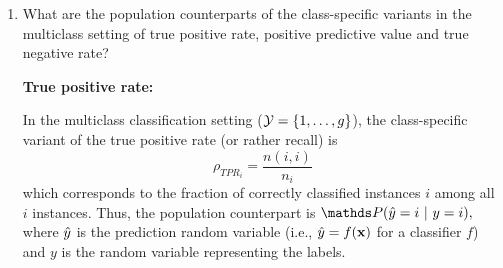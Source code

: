 \documentclass[a4paper]{article}
\begin{document}
{\begin{enumerate}
	G score is computed by $ \rho_{G} =  \sqrt{\rho_{PPV} \cdot \rho_{TPR} }.$
%	
	Thus, with the above
%	
	$$		\rho_{G}(M_1) = 0  , \quad \rho_{G} (M_2)   = \sqrt{1 \cdot 0.5} = \sqrt{0.5} \approx 0.7071  ,\quad \rho_{G}(M_3)  = \sqrt{1 \cdot 0.5} = \sqrt{0.5} \approx 0.7071.	$$
	
	
	\textbf{G mean:}
	
	G mean is computed by $ \rho_{G_m} =  \sqrt{\rho_{TNR} \cdot \rho_{TPR} },$ where $\rho_{TNR} = \frac{TN}{TN + FP}$ and $\rho_{TPR} = \frac{TP}{TP + FN}.$
%	
	For the TNR we have
	$$		\rho_{TNR}(M_1) = \frac{990}{1000} = 0.99  , \quad \rho_{TNR} (M_2)   =  \frac{980}{980} = 1  ,\quad \rho_{TNR}(M_3)  =    \frac{980}{990} \approx 0.9899  ,	$$
	Thus, with the above
	$$		\rho_{G_m}(M_1) = 0, \quad \rho_{G_m} (M_2)   = \sqrt{1 \cdot 0.5} = \sqrt{0.5} \approx 0.7071  ,\quad \rho_{G_m}(M_3)  = \sqrt{1 \cdot \frac{980}{990} } \approx 0.9949.	$$
	
	
	\textbf{BAC:}
	
	BAC is computed by $ \rho_{BAC} =  \frac{\rho_{TNR} + \rho_{TPR} }{2}.$	
%	
	Thus, with the above
	$$		\rho_{BAC}(M_1) = \frac{0 + 990/1000}{2} \approx 0.5, \quad \rho_{BAC} (M_2)   = \frac{1 + 0.5}{2} = 0.75,\quad \rho_{BAC}(M_3)  = \frac{1 + \frac{980}{990} }{2} \approx 0.9949.	$$
%	
	
	\textbf{MCC:}
%	
	MCC is computed by $ \rho_{MCC} =  \frac{TP\cdot TN - FP\cdot FN}{ \sqrt{(TP+FN)(TP+FP)(TN+FN)(TN+FP)} }.$	
	Thus, with the above
	$$		\rho_{MCC}(M_1) = 0, \quad \rho_{MCC} (M_2)   = \frac{ 10\cdot 980 - 0 }{  \sqrt{20\cdot10\cdot990\cdot980}  } = 0.7035265,\quad \rho_{MCC}(M_3)  = \frac{ 10\cdot 980 - 0 }{  \sqrt{20\cdot10\cdot990\cdot980}  } = 0.7035265.	$$
	
	\item What are the population counterparts of the class-specific variants in the multiclass setting of true positive rate, positive predictive value and true negative rate?
	
	\textbf{True positive rate:}
	
	In the multiclass classification setting ($\mathcal{Y}=\{1,\ldots,g\}$), the class-specific variant of the true positive rate (or rather recall) is 
%	
	$$ \rho_{TPR_i} = \frac{n(i,i)}{n_i} $$
%	
	which corresponds to the fraction of correctly classified instances $i$	among all $i$ instances.
%	
	Thus, the population counterpart is $\P(  \yh = i ~|~ y=i ),$ where $\hat{y}$ is the prediction random variable (i.e., $\hat{y}=f(\mathbf{x})$ for a classifier $f$) and $y$ is the random variable representing the labels.
	

\end{enumerate}}
\end{document}
